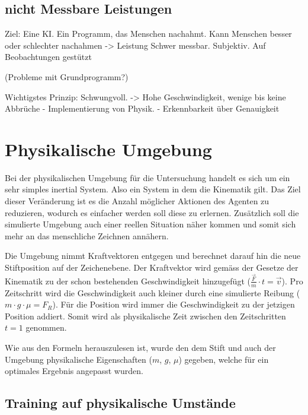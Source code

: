     \subsection*{nicht Messbare Leistungen}
    Ziel: Eine KI. Ein Programm, das Menschen nachahmt. 
    Kann Menschen besser oder schlechter nachahmen -> Leistung
    Schwer messbar. Subjektiv. Auf Beobachtungen gestützt

    (Probleme mit Grundprogramm?)
    
    Wichtigstes Prinzip: Schwungvoll. -> Hohe Geschwindigkeit, wenige bis keine Abbrüche
        - Implementierung von Physik. 
        - Erkennbarkeit über Genauigkeit


\section{Physikalische Umgebung}
Bei der physikalischen Umgebung für die Untersuchung handelt es sich um ein sehr
simples inertial System. Also ein System in dem die Kinematik gilt. Das Ziel
dieser Veränderung ist es die Anzahl möglicher Aktionen des Agenten zu
reduzieren, wodurch es einfacher werden soll diese zu erlernen. Zusätzlich soll
die simulierte Umgebung auch einer reellen Situation näher kommen und somit sich
mehr an das menschliche Zeichnen annähern.

Die Umgebung nimmt Kraftvektoren entgegen und berechnet darauf hin die neue
Stiftposition auf der Zeichenebene. Der Kraftvektor wird gemäss der Gesetze der
Kinematik zu der schon bestehenden Geschwindigkeit hinzugefügt
($\frac{\vec{F}}{m}\cdot t=\vec{v}$). Pro Zeitschritt wird die Geschwindigkeit
auch kleiner durch eine simulierte Reibung ($m\cdot g \cdot \mu = F_R$). Für die
Position wird immer die Geschwindigkeit zu der jetzigen Position addiert. Somit
wird als physikalische Zeit zwischen den Zeitschritten $t=1$ genommen.

Wie aus den Formeln herauszulesen ist, wurde den dem Stift und auch der Umgebung
physikalische Eigenschaften ($m$, $g$, $\mu$) gegeben, welche für ein optimales
Ergebnis angepasst wurden.


\subsection*{Training auf physikalische Umstände}

